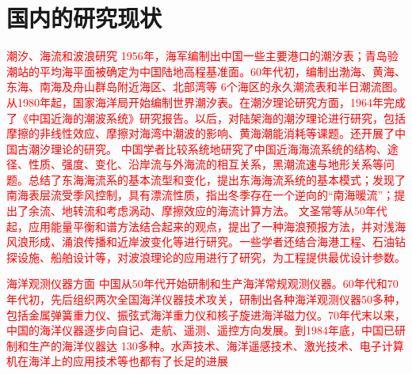 \section{国内的研究现状}

\textcolor{red}{
潮汐、海流和波浪研究
1956年，海军编制出中国一些主要港口的潮汐表；青岛验潮站的平均海平面被确定为中国陆地高程基准面。60年代初，编制出渤海、黄海、东海、南海及舟山群岛附近海区、北部湾等 6个海区的永久潮流表和半日潮流图。从1980年起，国家海洋局开始编制世界潮汐表。在潮汐理论研究方面，1964年完成了《中国近海的潮波系统》研究报告。以后，对陆架海的潮汐理论进行研究，包括摩擦的非线性效应、摩擦对海湾中潮波的影响、黄海潮能消耗等课题。还开展了中国古潮汐理论的研究。
中国学者比较系统地研究了中国近海海流系统的结构、途径、性质、强度、变化、沿岸流与外海流的相互关系，黑潮流速与地形关系等问题。总结了东海海流系的基本流型和变化，提出东海海流系统的基本模式；发现了南海表层流受季风控制，具有漂流性质，指出冬季存在一个逆向的“南海暖流”；提出了余流、地转流和考虑涡动、摩擦效应的海流计算方法。
文圣常等从50年代起，应用能量平衡和谱方法结合起来的观点，提出了一种海浪预报方法，并对浅海风浪形成、涌浪传播和近岸波变化等进行研究。一些学者还结合海港工程、石油钻探设施、船舶设计等，对波浪理论的应用进行了研究，为工程提供最优设计参数。
}

\textcolor{red}{
海洋观测仪器方面
中国从50年代开始研制和生产海洋常规观测仪器。60年代和70年代初，先后组织两次全国海洋仪器技术攻关，研制出各种海洋观测仪器50多种，包括金属弹簧重力仪、振弦式海洋重力仪和核子旋进海洋磁力仪。70年代末以来，中国的海洋仪器逐步向自记、走航、遥测、遥控方向发展。到1984年底，中国已研制和生产的海洋仪器达 130多种。水声技术、海洋遥感技术、激光技术、电子计算机在海洋上的应用技术等也都有了长足的进展
}
